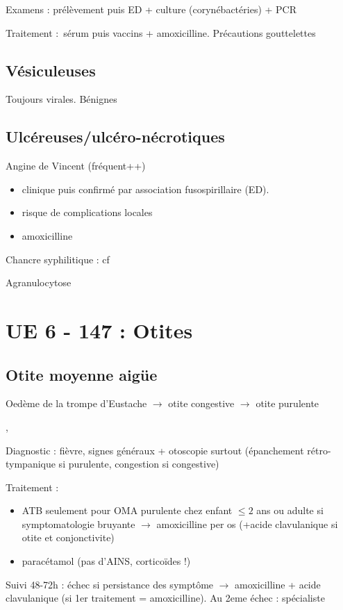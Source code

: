 Examens : prélèvement puis ED + culture (corynébactéries) + PCR

Traitement : sérum puis vaccins + amoxicilline. Précautions gouttelettes

\subsection{Vésiculeuses}%
Toujours virales. Bénignes


\subsection{Ulcéreuses/ulcéro-nécrotiques}
Angine de Vincent (fréquent++) 
\begin{itemize}
  \item clinique puis confirmé par association fusospirillaire (ED).
  \item risque de complications locales
  \item amoxicilline
\end{itemize}

Chancre syphilitique : cf~

Agranulocytose

\section{UE 6 - 147 : Otites}%
\label{sec:otites}
\subsection{Otite moyenne aigüe}%
\label{sub:otite_moyenn_aigue}
Oedème de la trompe d'Eustache $\to$ otite congestive $\to$ otite purulente

, 

Diagnostic : fièvre, signes généraux + otoscopie surtout (épanchement
rétro-tympanique si purulente, congestion si congestive)

Traitement : 
\begin{itemize}
  \item ATB seulement pour OMA purulente chez enfant $\le 2$ ans ou adulte si
symptomatologie bruyante
$\rightarrow$ amoxicilline per os (+acide clavulanique si otite et conjonctivite)
\item paracétamol (pas d'AINS, corticoïdes !)
\end{itemize}

Suivi 48-72h : échec si persistance des symptôme $\rightarrow$ amoxicilline +
acide clavulanique (si 1er traitement = amoxicilline). Au 2eme échec :
spécialiste

